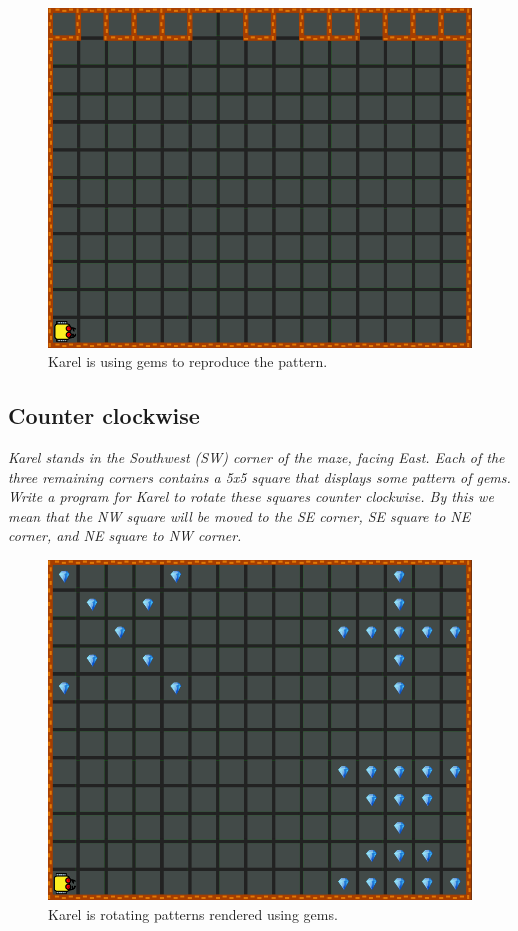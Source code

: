 \begin{figure}[!ht]
\begin{center}
\includegraphics[height=0.4\textwidth]{img/h03.png}
\end{center}
\vspace{-4mm}
\caption{Karel is using gems to reproduce the pattern.}
\vspace{-1.2cm}
\label{fig:h03}
\end{figure}


\subsection{Counter clockwise}

{\em Karel stands in the Southwest (SW) corner of the maze, facing East. Each of the three remaining corners contains a 5x5 square that displays some pattern of gems. Write a program for Karel to rotate these squares counter clockwise. By this we mean that the NW square will be moved to the SE corner, SE square to NE corner, and NE square to NW corner.}\\[-9mm]

\begin{figure}[!ht]
\begin{center}
\includegraphics[height=0.4\textwidth]{img/h04.png}
\end{center}
\vspace{-4mm}
\caption{Karel is rotating patterns rendered using gems.}
\vspace{-1.2cm}
\label{fig:h04}
\end{figure}
\newpage




